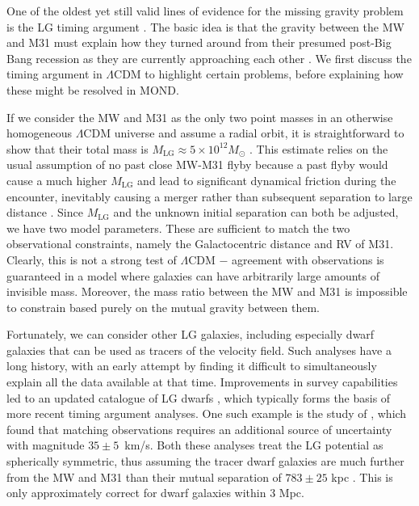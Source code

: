 \documentclass[fleqn,usenatbib,useAMS]{mnras} %
\begin{document}
One of the oldest yet still valid lines of evidence for the missing gravity problem is the LG timing argument \citep{Kahn_Woltjer_1959}. The basic idea is that the gravity between the MW and M31 must explain how they turned around from their presumed post-Big Bang recession as they are currently approaching each other \citep[e.g.][]{Van_der_Marel_2012}. We first discuss the timing argument in $\Lambda$CDM to highlight certain problems, before explaining how these might be resolved in MOND.

If we consider the MW and M31 as the only two point masses in an otherwise homogeneous $\Lambda$CDM universe and assume a radial orbit, it is straightforward to show that their total mass is $M_\text{LG} \approx 5 \times 10^{12} M_\odot$ \citep[e.g.][]{Li_White_2008}. This estimate relies on the usual assumption of no past close MW-M31 flyby because a past flyby would cause a much higher $M_\text{LG}$ \citep{Benisty_2019} and lead to significant dynamical friction during the encounter, inevitably causing a merger rather than subsequent separation to large distance \citep[e.g.][]{Privon_2013, Kroupa_2015}. Since $M_\text{LG}$ and the unknown initial separation can both be adjusted, we have two model parameters. These are sufficient to match the two observational constraints, namely the Galactocentric distance and RV of M31. Clearly, this is not a strong test of $\Lambda$CDM $-$ agreement with observations is guaranteed in a model where galaxies can have arbitrarily large amounts of invisible mass. Moreover, the mass ratio between the MW and M31 is impossible to constrain based purely on the mutual gravity between them.

Fortunately, we can consider other LG galaxies, including especially dwarf galaxies that can be used as tracers of the velocity field. Such analyses have a long history, with an early attempt by \citet{Sandage_1986} finding it difficult to simultaneously explain all the data available at that time. Improvements in survey capabilities led to an updated catalogue of LG dwarfs \citep{McConnachie_2012}, which typically forms the basis of more recent timing argument analyses. One such example is the study of \citet{Jorge_2014}, which found that matching observations requires an additional source of uncertainty with magnitude ${35 \pm 5}$~km/s. Both these analyses treat the LG potential as spherically symmetric, thus assuming the tracer dwarf galaxies are much further from the MW and M31 than their mutual separation of $783 \pm 25$ kpc \citep{McConnachie_2012}. This is only approximately correct for dwarf galaxies within 3 Mpc.
\end{document}
